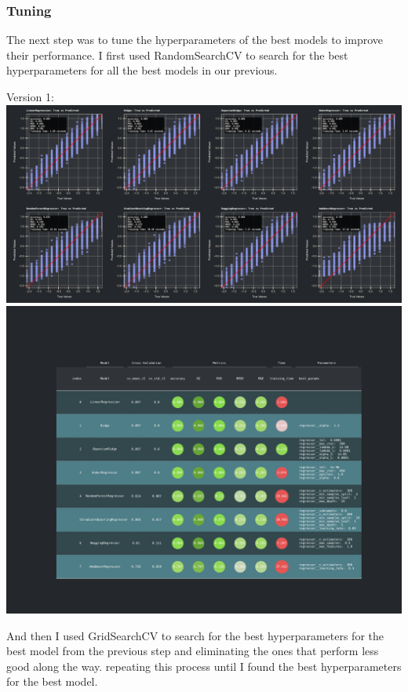 \documentclass{assignment}
\begin{document}
\subsubsection{Tuning}
The next step was to tune the hyperparameters of the best models to improve their performance.
I first used RandomSearchCV to search for the best hyperparameters for all the best models in our previous.
\begin{center}
    Version 1:
    \includegraphics[width=6.5in]{../report/assets/ver1_best_models_result.pdf}    
    \includegraphics[width=6.5in]{../report/assets/ver1_best_models_result_table.pdf}
\end{center}
And then I used GridSearchCV to search for the best hyperparameters for the best model from the previous step and eliminating the ones that perform less good along the way.
repeating this process until I found the best hyperparameters for the best model.
\end{document}
